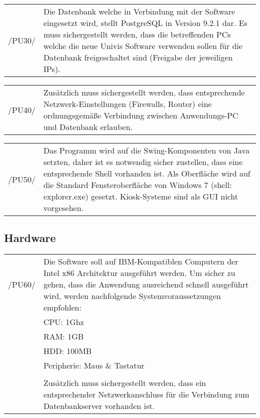 \begin{tabular}{p{1.5cm}p{14.5cm}}

	 /PU30/	&  Die Datenbank welche in Verbindung mit der Software eingesetzt wird, stellt PostgreSQL in Version 9.2.1 dar.
Es muss sichergestellt werden, dass die betreffenden PCs welche die neue Univis Software verwenden sollen für die Datenbank freigeschaltet sind (Freigabe der jeweiligen IPs).\\[0.25cm]

\end{tabular}


\begin{tabular}{p{1.5cm}p{14.5cm}}

	 /PU40/	&  Zusätzlich muss sichergestellt werden, dass entsprechende Netzwerk-Einstellungen (Firewalls, Router) eine ordnungsgemäße Verbindung zwischen Anwendungs-PC und Datenbank erlauben.\\[0.25cm]

\end{tabular}


\begin{tabular}{p{1.5cm}p{14.5cm}}

	 /PU50/	&  Das Programm wird auf die Swing-Komponenten von Java setzten, daher ist es notwendig sicher zustellen, dass eine entsprechende Shell vorhanden ist.
Als Oberfläche wird auf die Standard Fensteroberfläche von Windows 7 (shell: explorer.exe) gesetzt. Kiosk-Systeme sind als GUI nicht vorgesehen.\\[0.25cm]

\end{tabular}


\subsection{Hardware}
\label{subsec:hardware}


\begin{tabular}{p{1.5cm}p{14.5cm}}

	 /PU60/	&  Die Software soll auf IBM-Kompatiblen Computern der Intel x86 Architektur ausgeführt werden.
Um sicher zu gehen, dass die Anwendung ausreichend schnell ausgeführt wird, werden nachfolgende Systemvoraussetzungen empfohlen:\\

	&CPU: 1Ghz\\
	&RAM: 1GB\\
	&HDD: 100MB\\
	&Peripherie: Maus \& Tastatur\\
	&\\
	&Zusätzlich muss sichergestellt werden, dass ein entsprechender Netzwerkanschluss für die Verbindung zum Datenbankserver vorhanden ist.\\[0.25cm]


\end{tabular}

